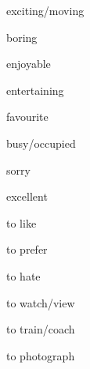 \documentclass[avery5371,grid,frame]{flashcards}
\begin{document}
\begin{flashcard}{\LARGE exciting/moving}
\LARGE {}
\end{flashcard}
\begin{flashcard}{\LARGE boring}
\LARGE {}
\end{flashcard}
\begin{flashcard}{\LARGE enjoyable}
\LARGE {}
\end{flashcard}
\begin{flashcard}{\LARGE entertaining}
\LARGE {}
\end{flashcard}
\begin{flashcard}{\LARGE favourite}
\LARGE {}
\end{flashcard}
\begin{flashcard}{\LARGE busy/occupied}
\LARGE {}
\end{flashcard}
\begin{flashcard}{\LARGE sorry}
\LARGE {}
\end{flashcard}
\begin{flashcard}{\LARGE excellent}
\LARGE {}
\end{flashcard}
\begin{flashcard}{\LARGE to like}
\LARGE {}
\end{flashcard}
\begin{flashcard}{\LARGE to prefer}
\LARGE {}
\end{flashcard}
\begin{flashcard}{\LARGE to hate}
\LARGE {}
\end{flashcard}
\begin{flashcard}{\LARGE to watch/view}
\LARGE {}
\end{flashcard}
\begin{flashcard}{\LARGE to train/coach}
\LARGE {}
\end{flashcard}
\begin{flashcard}{\LARGE to photograph}
\LARGE {}
\end{flashcard}
\end{document}
